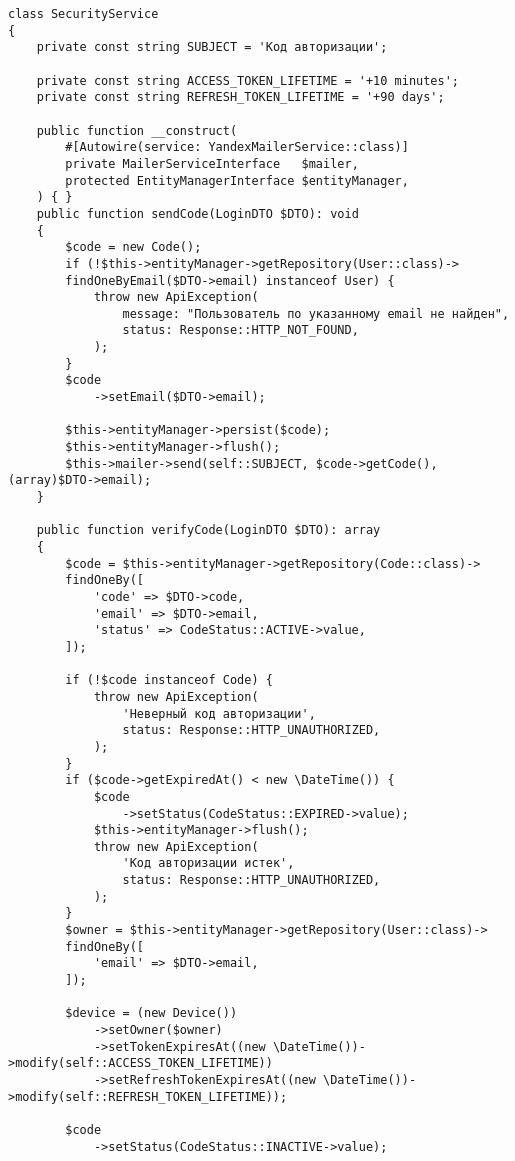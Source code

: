 \documentclass[pract]{SCWorks}
\begin{document}
\begin{verbatim}
class SecurityService
{
    private const string SUBJECT = 'Код авторизации';

    private const string ACCESS_TOKEN_LIFETIME = '+10 minutes';
    private const string REFRESH_TOKEN_LIFETIME = '+90 days';

    public function __construct(
        #[Autowire(service: YandexMailerService::class)]
        private MailerServiceInterface   $mailer,
        protected EntityManagerInterface $entityManager,
    ) { }
    public function sendCode(LoginDTO $DTO): void
    {
        $code = new Code();
        if (!$this->entityManager->getRepository(User::class)->
        findOneByEmail($DTO->email) instanceof User) {
            throw new ApiException(
                message: "Пользователь по указанному email не найден",
                status: Response::HTTP_NOT_FOUND,
            );
        }
        $code
            ->setEmail($DTO->email);

        $this->entityManager->persist($code);
        $this->entityManager->flush();
        $this->mailer->send(self::SUBJECT, $code->getCode(), (array)$DTO->email);
    }

    public function verifyCode(LoginDTO $DTO): array
    {
        $code = $this->entityManager->getRepository(Code::class)->
        findOneBy([
            'code' => $DTO->code,
            'email' => $DTO->email,
            'status' => CodeStatus::ACTIVE->value,
        ]);

        if (!$code instanceof Code) {
            throw new ApiException(
                'Неверный код авторизации',
                status: Response::HTTP_UNAUTHORIZED,
            );
        }
        if ($code->getExpiredAt() < new \DateTime()) {
            $code
                ->setStatus(CodeStatus::EXPIRED->value);
            $this->entityManager->flush();
            throw new ApiException(
                'Код авторизации истек',
                status: Response::HTTP_UNAUTHORIZED,
            );
        }
        $owner = $this->entityManager->getRepository(User::class)->
        findOneBy([
            'email' => $DTO->email,
        ]);

        $device = (new Device())
            ->setOwner($owner)
            ->setTokenExpiresAt((new \DateTime())->modify(self::ACCESS_TOKEN_LIFETIME))
            ->setRefreshTokenExpiresAt((new \DateTime())->modify(self::REFRESH_TOKEN_LIFETIME));
        
        $code
            ->setStatus(CodeStatus::INACTIVE->value);


\end{verbatim}
\end{document}

